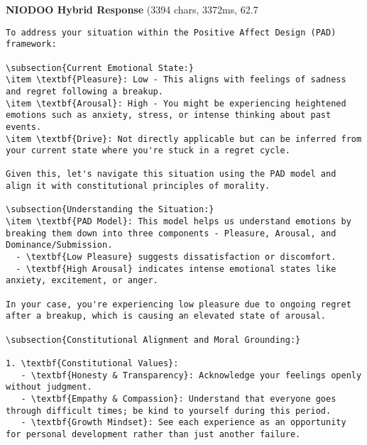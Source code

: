 \documentclass[11pt,a4paper]{article}
\begin{document}
\textbf{NIODOO Hybrid Response} (3394 chars, 3372ms, 62.7%
\begin{verbatim}To address your situation within the Positive Affect Design (PAD) framework:

\subsection{Current Emotional State:}
\item \textbf{Pleasure}: Low - This aligns with feelings of sadness and regret following a breakup.
\item \textbf{Arousal}: High - You might be experiencing heightened emotions such as anxiety, stress, or intense thinking about past events.
\item \textbf{Drive}: Not directly applicable but can be inferred from your current state where you're stuck in a regret cycle.

Given this, let's navigate this situation using the PAD model and align it with constitutional principles of morality.

\subsection{Understanding the Situation:}
\item \textbf{PAD Model}: This model helps us understand emotions by breaking them down into three components - Pleasure, Arousal, and Dominance/Submission.
  - \textbf{Low Pleasure} suggests dissatisfaction or discomfort.
  - \textbf{High Arousal} indicates intense emotional states like anxiety, excitement, or anger.

In your case, you're experiencing low pleasure due to ongoing regret after a breakup, which is causing an elevated state of arousal. 

\subsection{Constitutional Alignment and Moral Grounding:}

1. \textbf{Constitutional Values}:
   - \textbf{Honesty & Transparency}: Acknowledge your feelings openly without judgment.
   - \textbf{Empathy & Compassion}: Understand that everyone goes through difficult times; be kind to yourself during this period.
   - \textbf{Growth Mindset}: See each experience as an opportunity for personal development rather than just another failure.
   

\end{verbatim}
\end{document}
